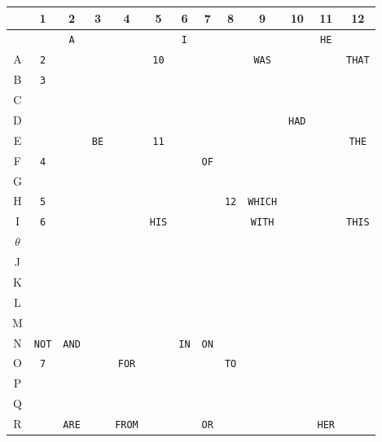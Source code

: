 \begin{table}
\begin{threeparttable}
			{ 
				\setlength{\tabcolsep}{0em}
				\fontsize{9}{14} \selectfont
				\begin{tabularx}{\textwidth}{C{1}||C{1}|C{1}|C{1}|C{1}|C{1}|C{1}|C{1}|C{1}|C{1}|C{1}|C{1}|C{1}|}
					& 1\tnote{W} & 2 & 3 & 4 
					& 5 & 6 & 7 & 8 
					& 9 & 10 & 11 & 12 \\
					\hline \hline
					\textunderscore{} && \texttt{A} &&&& \texttt{I} &&&&& \texttt{HE} & \\
					\hline
					A & \texttt{2} &&&& \texttt{10} &&&& \texttt{WAS} &&& \texttt{THAT} \\
					\hline
					B & \texttt{3} &&&&&&&&&&& \\
					\hline
					C &&&&&&&&&&&& \\
					\hline
					D &&&&&&&&&& \texttt{HAD} && \\
					\hline
					E & && \texttt{BE} && \texttt{11} &&&&&&& \texttt{THE}  \\
					\hline
					F & \texttt{4} &&&&&& \texttt{OF} &&&&& \\
					\hline
					G &&&&&&&&&&&& \\
					\hline
					H & \texttt{5\tnote{W}} &&&&&&& \texttt{12} & \texttt{WHICH} &&& \\
					\hline
					I & \texttt{6} &&&& \texttt{HIS} &&&& \texttt{WITH} &&& \texttt{THIS} \\
					\hline
					$\theta$ &&&&&&&&&&&& \\
					\hline
					J &&&&&&&&&&&& \\
					\hline
					K &&&&&&&&&&&& \\
					\hline
					L &&&&&&&&&&&& \\
					\hline
					M &&&&&&&&&&&& \\
					\hline
					N & \texttt{NOT} & \texttt{AND} &&&& \texttt{IN} & \texttt{ON} &&&&& \\
					\hline
					O & \texttt{7} &&& \texttt{FOR} &&&& \texttt{TO} &&&& \\
					\hline
					P &&&&&&&&&&&& \\
					\hline
					Q &&&&&&&&&&&& \\
					\hline
					R && \texttt{ARE} && \texttt{FROM} &&& \texttt{OR} &&&& \texttt{HER} & \\

\end{tabularx}}
\end{threeparttable}
\end{table}
